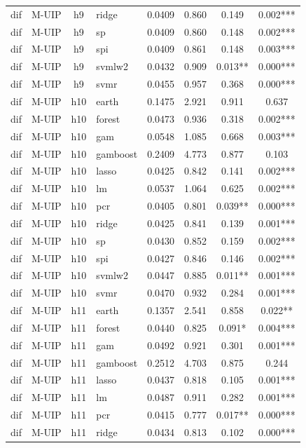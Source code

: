 \begin{ThreePartTable}
\begin{longtable}[t]{llclcccc}
dif & M-UIP & h9 & ridge & 0.0409 & 0.860 & 0.149 & 0.002***\\
dif & M-UIP & h9 & sp & 0.0409 & 0.860 & 0.148 & 0.002***\\
dif & M-UIP & h9 & spi & 0.0409 & 0.861 & 0.148 & 0.003***\\
dif & M-UIP & h9 & svmlw2 & 0.0432 & 0.909 & 0.013** & 0.000***\\
dif & M-UIP & h9 & svmr & 0.0455 & 0.957 & 0.368 & 0.000***\\
\addlinespace
dif & M-UIP & h10 & earth & 0.1475 & 2.921 & 0.911 & 0.637\\
dif & M-UIP & h10 & forest & 0.0473 & 0.936 & 0.318 & 0.002***\\
dif & M-UIP & h10 & gam & 0.0548 & 1.085 & 0.668 & 0.003***\\
dif & M-UIP & h10 & gamboost & 0.2409 & 4.773 & 0.877 & 0.103\\
dif & M-UIP & h10 & lasso & 0.0425 & 0.842 & 0.141 & 0.002***\\
dif & M-UIP & h10 & lm & 0.0537 & 1.064 & 0.625 & 0.002***\\
dif & M-UIP & h10 & pcr & 0.0405 & 0.801 & 0.039** & 0.000***\\
dif & M-UIP & h10 & ridge & 0.0425 & 0.841 & 0.139 & 0.001***\\
dif & M-UIP & h10 & sp & 0.0430 & 0.852 & 0.159 & 0.002***\\
dif & M-UIP & h10 & spi & 0.0427 & 0.846 & 0.146 & 0.002***\\
dif & M-UIP & h10 & svmlw2 & 0.0447 & 0.885 & 0.011** & 0.001***\\
dif & M-UIP & h10 & svmr & 0.0470 & 0.932 & 0.284 & 0.001***\\
\addlinespace
dif & M-UIP & h11 & earth & 0.1357 & 2.541 & 0.858 & 0.022**\\
dif & M-UIP & h11 & forest & 0.0440 & 0.825 & 0.091* & 0.004***\\
dif & M-UIP & h11 & gam & 0.0492 & 0.921 & 0.301 & 0.001***\\
dif & M-UIP & h11 & gamboost & 0.2512 & 4.703 & 0.875 & 0.244\\
dif & M-UIP & h11 & lasso & 0.0437 & 0.818 & 0.105 & 0.001***\\
dif & M-UIP & h11 & lm & 0.0487 & 0.911 & 0.282 & 0.001***\\
dif & M-UIP & h11 & pcr & 0.0415 & 0.777 & 0.017** & 0.000***\\
dif & M-UIP & h11 & ridge & 0.0434 & 0.813 & 0.102 & 0.000***\\

\end{longtable}
\end{ThreePartTable}
